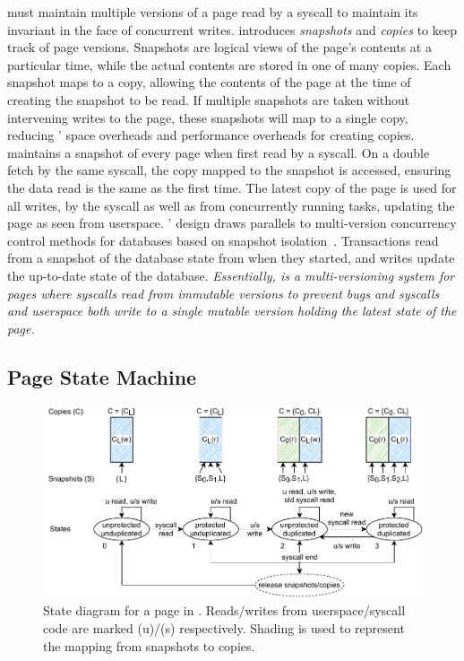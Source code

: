 \documentclass[letterpaper,twocolumn,10pt]{article}
\begin{document}
\midas must maintain multiple versions of a page read by a syscall
to maintain its invariant in the face of concurrent writes.
\midas introduces \emph{snapshots} and \emph{copies} to keep track
of page versions.
Snapshots are logical views of the page's contents at a particular time,
while the actual contents are stored in one of many copies.
Each snapshot maps to a copy, allowing the contents of the page at the
time of creating the snapshot to be read.
If multiple snapshots are taken without intervening writes to the page,
these snapshots will map to a single copy, reducing \midas' space overheads
and performance overheads for creating copies.
\midas maintains a snapshot of every page when first read by a syscall.
On a double fetch by the same syscall, the copy mapped to the snapshot
is accessed, ensuring the data read is the same as the first time.
The latest copy of the page is used for all writes, by the syscall as
well as from concurrently running tasks, updating the page as seen
from userspace.
%
\midas' design draws parallels to multi-version concurrency control
methods for databases based on snapshot isolation~\cite{WuALXP17}.
Transactions read from a snapshot of the database state from when
they started, and writes update the up-to-date state of the database.
%
\emph{Essentially, \midas is a multi-versioning system for pages where
syscalls read from immutable versions to prevent \tocttou bugs and
syscalls and userspace both write to a single mutable version
holding the latest state of the page.}

\subsection{Page State Machine}

\begin{figure}[]
  \centering
  \includegraphics[width=0.9\linewidth]{img/midas_states.pdf}
  \caption{State diagram for a page in \midas. Reads/writes from userspace/syscall
          code are marked (u)/(s) respectively. Shading is used to represent the
          mapping from snapshots to copies.}
  \label{fig:midas_states}
\end{figure}
\end{document}

